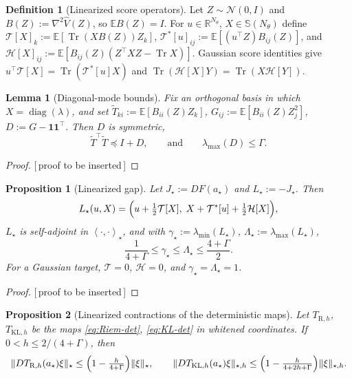 \documentclass[11pt]{article}
\theoremstyle{plain}
\newtheorem{proposition}[proposition]{Proposition}
\newtheorem{lemma}[lemma]{Lemma}
\theoremstyle{definition}
\newtheorem{definition}[definition]{Definition}
\theoremstyle{remark}
\newcommand{\R}{\mathbb{R}}
\newcommand{\N}{\mathcal{N}}
\newcommand{\E}{\mathbb{E}}
\newcommand{\KL}{\mathrm{KL}}
\newcommand{\Tr}{\operatorname{Tr}}
\newcommand{\Sym}{\mathbb{S}}
\newcommand{\Id}{I}
\newcommand{\Riem}{\mathrm{R}}
\newcommand{\inner}[2]{\left\langle #1,#2\right\rangle}
\newcommand{\diag}{\operatorname{diag}}
\newcommand{\gstar}{\gamma_\star}
\newcommand{\Lstar}{L_\star}
\newcommand{\PROOFHOLE}{{\color{red}\textsf{[\,proof to be inserted\,]}}}
\begin{document}
\begin{definition}[Linearized score operators]
\label{def:linear-score-ops}
Let $Z\sim\N(0,\Id)$ and $B(Z):=\nabla^2\widehat V(Z)$, so $\E B(Z)=\Id$. For $u\in\R^{N_\theta}$,
$X\in\Sym(N_\theta)$ define
$\mathcal T[X]_k:=\E[\Tr(XB(Z))Z_k]$, $\mathcal T^*[u]_{ij}:=\E[(u^\top Z)B_{ij}(Z)]$, and
$\mathcal H[X]_{ij}:=\E[B_{ij}(Z)(Z^\top XZ-\Tr X)]$. Gaussian score identities give
$u^\top\mathcal T[X]=\Tr(\mathcal T^*[u]X)$ and $\Tr(\mathcal H[X]Y)=\Tr(X\mathcal H[Y])$.
\end{definition}

\begin{lemma}[Diagonal-mode bounds]
\label{lem:linear-diagonal-bounds}
Fix an orthogonal basis in which $X=\diag(\lambda)$, and set $\widetilde T_{ki}:=\E[B_{ii}(Z)Z_k]$,
$G_{ij}:=\E[B_{ii}(Z)Z_j^2]$, $D:=G-\mathbf1\mathbf1^\top$. Then $D$ is symmetric,
\begin{equation}
\label{eq:T-Schur}
    \widetilde T^\top\widetilde T\preceq\Id+D,
    \qquad\text{and}\qquad
    \lambda_{\max}(D)\leq\Gamma .
\end{equation}
\end{lemma}

\begin{proof}
\PROOFHOLE
\end{proof}

\begin{proposition}[Linearized gap]
\label{prop:linearized}
Let $J_\star:=DF(a_\star)$ and $\Lstar:=-J_\star$. Then
\[
    \Lstar(u,X)=\Bigl(u+\tfrac12\mathcal T[X],\;X+\mathcal T^*[u]+\tfrac12\mathcal H[X]\Bigr),
\]
$\Lstar$ is self-adjoint in $\inner{\cdot}{\cdot}_\star$, and with
$\gstar:=\lambda_{\min}(\Lstar)$, $\Lambda_\star:=\lambda_{\max}(\Lstar)$,
\begin{equation}
\label{eq:linear-gap-bounds}
    \boxed{\;\frac1{4+\Gamma}\leq\gstar\leq\Lambda_\star\leq\frac{4+\Gamma}2 .\;}
\end{equation}
For a Gaussian target, $\mathcal T=0$, $\mathcal H=0$, and $\gstar=\Lambda_\star=1$.
\end{proposition}

\begin{proof}
\PROOFHOLE
\end{proof}

\begin{proposition}[Linearized contractions of the deterministic maps]
\label{prop:linearized-maps}
Let $T_{\Riem,h}$, $T_{\KL,h}$ be the maps \eqref{eq:Riem-det}, \eqref{eq:KL-det} in whitened
coordinates. If $0<h\leq2/(4+\Gamma)$, then
\[
    \|DT_{\Riem,h}(a_\star)\xi\|_\star\leq\Bigl(1-\tfrac h{4+\Gamma}\Bigr)\|\xi\|_\star,
    \qquad
    \|DT_{\KL,h}(a_\star)\xi\|_{\star,h}\leq\Bigl(1-\tfrac h{4+2h+\Gamma}\Bigr)\|\xi\|_{\star,h}.
\]
\end{proposition}
\end{document}
